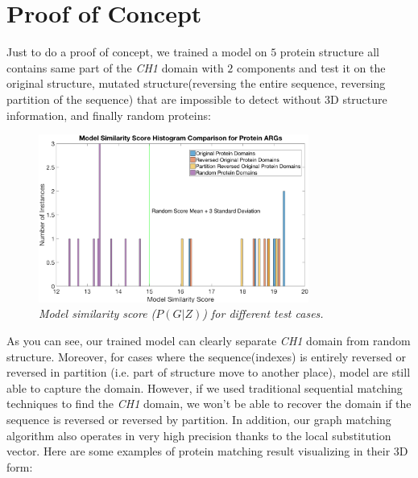\section{Proof of Concept}
\label{sec:poc}

Just to do a proof of concept\footnotemark, we trained a model on $5$ protein structure all contains same part of the \emph{CH1} domain with $2$ components and test it on the original structure, mutated structure(reversing the entire sequence, reversing partition of the sequence) that are impossible to detect without 3D structure information, and finally random proteins:

\begin{figure}[h]
	\centering
	\captionsetup{justification=centering}
	\includegraphics[width=0.79\textwidth]{figs/protein_learning.png}
	\caption[Caption for LOF]{\emph{Model similarity score ($P(G|Z)$) for different test cases.}}
	\label{fig:protein_learning}
\end{figure}

As you can see, our trained model can clearly separate \emph{CH1} domain from random structure. Moreover, for cases where the sequence(indexes) is entirely reversed or reversed in partition (i.e. part of structure move to another place), model are still able to capture the domain. However, if we used traditional sequential matching techniques to find the \emph{CH1} domain, we won't be able to recover the domain if the sequence is reversed or reversed by partition. In addition, our graph matching algorithm also operates in very high precision thanks to the local substitution vector. Here are some examples of protein matching result visualizing in their 3D form:\\

